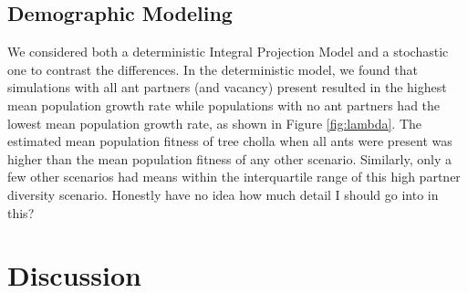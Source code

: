 \documentclass[12pt,a4paper]{article}
\begin{document}
		
		\subsection*{Demographic Modeling}
		We considered both a deterministic Integral Projection Model and a stochastic one to contrast the differences. 
		In the deterministic model, we found that simulations with all ant partners (and vacancy) present resulted in the highest mean population growth rate while populations with no ant partners had the lowest mean population growth rate, as shown in Figure \ref{fig:lambda}.
		The estimated mean population fitness of tree cholla when all ants were present was higher than the mean population fitness of any other scenario.
		Similarly, only a few other scenarios had means within the interquartile range of this high partner diversity scenario. 
		Honestly have no idea how much detail I should go into in this? 
		
		
		\section*{Discussion}
\end{document}
